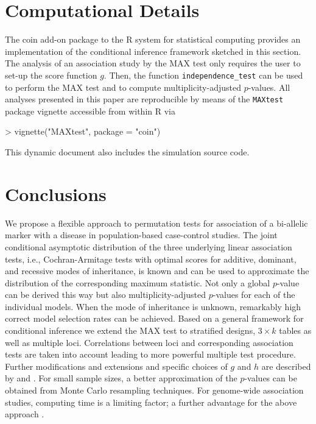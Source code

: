 \documentclass[bimj,fleqn]{w-art}
\newcommand{\Rpackage}[1]{{\normalfont\fontseries{b}\selectfont #1}}
\begin{document}
\section{Computational Details \label{Comp}}

The \Rpackage{coin} add-on package \citep{Hothorn:2006:AmStat, PKG:coin, Hothorn+Hornik+VanDeWiel:2008}
to the \textsf{R} system for statistical computing \citep{rcore2007}
provides an implementation of the conditional inference framework
sketched in this section. The analysis of an association study 
by the MAX test only requires the user to set-up the score function $g$. Then, the
function \texttt{independence\_test} can be used to perform 
the MAX test and to compute multiplicity-adjusted $p$-values.
All analyses presented in this paper
are reproducible by means of the \texttt{MAXtest} package vignette
accessible from within \textsf{R} via
\begin{Schunk}
\begin{Sinput}
> vignette("MAXtest", package = "coin")
\end{Sinput}
\end{Schunk}
This dynamic document also includes the simulation source code.

\section{Conclusions}

We propose a flexible approach to permutation tests for association of a    
bi-allelic marker with a disease in population-based case-control 
studies. The joint conditional asymptotic distribution of the 
three underlying 
linear association tests, i.e., Cochran-Armitage tests with optimal
scores for additive, dominant, and recessive modes of inheritance,
is known and can be used to approximate the distribution of the 
corresponding maximum statistic.
Not only a global $p$-value can be derived this way but also
multiplicity-adjusted $p$-values for each of the individual models. 
When the mode of inheritance is unknown, remarkably high correct model 
selection rates can be achieved. Based on a general framework for conditional 
inference we extend the MAX test to stratified designs, $3 \times k$ tables 
as well as multiple loci. Correlations between 
loci and corresponding association tests are taken into account leading to 
more powerful multiple test procedure. Further modifications and extensions
and specific choices of $g$ and $h$ are described by \cite{Hothorn:2006:AmStat} 
and \cite{Hothorn+Hornik+VanDeWiel:2008}.
For small sample sizes, a better approximation of the $p$-values 
can be obtained from Monte Carlo resampling techniques.
For genome-wide association studies, computing time is a limiting factor; 
a further advantage for the above approach \citep{Ziegler2008}.
\end{document}
